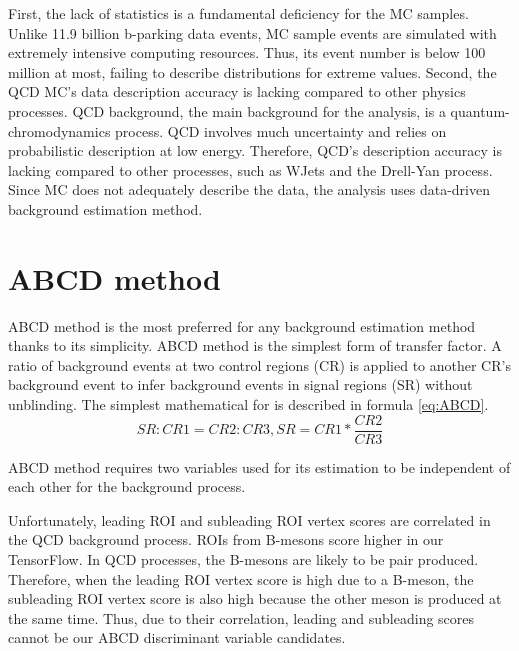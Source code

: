 First, the lack of statistics is a fundamental deficiency for the MC samples.
Unlike 11.9 billion b-parking data events, MC sample events are simulated with extremely intensive computing resources.
Thus, its event number is below 100 million at most, failing to describe distributions for extreme values.
Second, the QCD MC's data description accuracy is lacking compared to other physics processes.
QCD background, the main background for the analysis, is a quantum-chromodynamics process.
QCD involves much uncertainty and relies on probabilistic description at low energy.
Therefore, QCD's description accuracy is lacking compared to other processes, such as WJets and the Drell-Yan process.
Since MC does not adequately describe the data, the analysis uses data-driven background estimation method.




\section{ABCD method}
ABCD method is the most preferred for any background estimation method thanks to its simplicity.
ABCD method is the simplest form of transfer factor.
A ratio of background events at two control regions (CR) is applied to another CR's background event to infer background events in signal regions (SR) without unblinding.
The simplest mathematical for is described in formula \ref{eq:ABCD}.
\begin{equation}
\label{eq:ABCD}
	SR:CR1=CR2:CR3, SR=CR1*\frac{CR2}{CR3} 
\end{equation}

ABCD method requires two variables used for its estimation to be independent of each other for the background process.


Unfortunately, leading ROI and subleading ROI vertex scores are correlated in the QCD background process.
ROIs from B-mesons score higher in our TensorFlow.
In QCD processes, the B-mesons are likely to be pair produced.
Therefore, when the leading ROI vertex score is high due to a B-meson, the subleading ROI vertex score is also high because the other meson is produced at the same time.
Thus, due to their correlation, leading and subleading scores cannot be our ABCD discriminant variable candidates.

